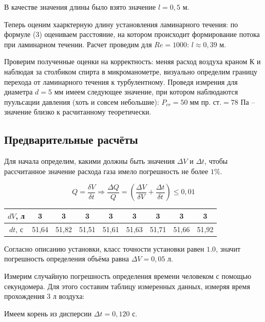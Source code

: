 \documentclass[a4paper, 12pt]{article} %
\begin{document}
В качестве значения длины было взято значение $l = 0,5$ м.

Теперь оценим хаарктерную  длину установления ламинарного течения: по формуле (3) оцениваем расстояние, на котором происходит формирование потока при ламинарном течении. Расчет проведим для $Re = 1000$: $l \approx 0,39$ м.

Проверим полученные оценки на корректность: меняя расход воздуха краном К и наблюдая за столбиком спирта в микроманометре, визуально определим границу перехода от ламинарного течения к турбулентному. Проведя измрения для диаметра $d = 5$ мм имеем следующее значение, при котором наблюдаются пуульсации давления (хоть и совсем небольшие): $P_{cr} = 50 \; \text{мм пр. ст.} =  78$ Па -- значение близко к расчитанному теоретически.

\subsection{Предварительные расчёты}

Для начала определим, какими должны быть значения $\Delta V$ и $\Delta t$, чтобы рассчитанное значение расхода газа имело погрешность не более $1\%$.
 
\begin{equation}
    Q = \frac{\delta V}{\delta t} \Rightarrow \frac{\Delta Q}{Q} =  \left( \frac{\Delta V}{\delta V} + \frac{\Delta t}{\delta t} \right) \leqslant 0,01
\end{equation}

\begin{center}
    \begin{tabular}{|c|c|c|c|c|c|c|c|c|}
        \hline
        $dV$, л & 3     & 3     & 3     & 3     & 3     & 3     & 3     & 3     \\ \hline
        $dt$, с & 51,64 & 51,82 & 51,51 & 51,61 & 51,63 & 51,71 & 51,66 & 51,92 \\ \hline
    \end{tabular}
\end{center}

Согласно описанию установки, класс точности установки равен $1.0$, значит погрешность определения объёма равна $\Delta V = 0,05$ л.

Измерим случайную погрешность определения времени человеком с помощью секундомера. Для этого составим таблицу измеренных данных, измеряя время прохождения 3 л воздуха:

Имеем корень из дисперсии $\Delta t = 0,120$ с.
\end{document}
